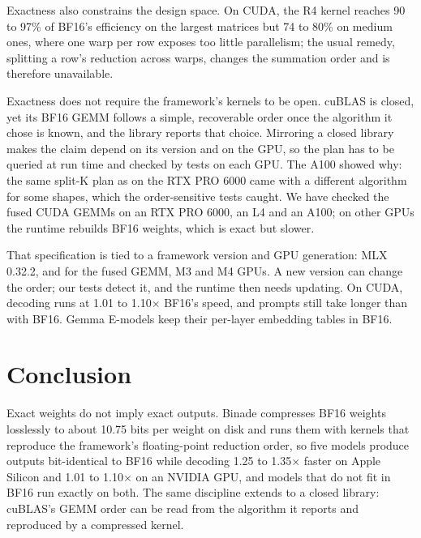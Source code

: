 \documentclass[11pt]{article}
\newcommand{\x}{$\times$}
\begin{document}
Exactness also constrains the design space. On CUDA, the R4 kernel reaches 90 to 97\% of BF16's efficiency on the largest matrices but 74 to 80\% on medium ones, where one warp per row exposes too little parallelism; the usual remedy, splitting a row's reduction across warps, changes the summation order and is therefore unavailable.

Exactness does not require the framework's kernels to be open. cuBLAS is closed, yet its BF16 GEMM follows a simple, recoverable order once the algorithm it chose is known, and the library reports that choice. Mirroring a closed library makes the claim depend on its version and on the GPU, so the plan has to be queried at run time and checked by tests on each GPU. The A100 showed why: the same split-K plan as on the RTX PRO 6000 came with a different algorithm for some shapes, which the order-sensitive tests caught. We have checked the fused CUDA GEMMs on an RTX PRO 6000, an L4 and an A100; on other GPUs the runtime rebuilds BF16 weights, which is exact but slower.

That specification is tied to a framework version and GPU generation: MLX 0.32.2, and for the fused GEMM, M3 and M4 GPUs. A new version can change the order; our tests detect it, and the runtime then needs updating. On CUDA, decoding runs at 1.01 to 1.10\x{} BF16's speed, and prompts still take longer than with BF16. Gemma E-models keep their per-layer embedding tables in BF16.

\section{Conclusion}

Exact weights do not imply exact outputs. Binade compresses BF16 weights losslessly to about 10.75 bits per weight on disk and runs them with kernels that reproduce the framework's floating-point reduction order, so five models produce outputs bit-identical to BF16 while decoding 1.25 to 1.35\x{} faster on Apple Silicon and 1.01 to 1.10\x{} on an NVIDIA GPU, and models that do not fit in BF16 run exactly on both. The same discipline extends to a closed library: cuBLAS's GEMM order can be read from the algorithm it reports and reproduced by a compressed kernel.



\end{document}
